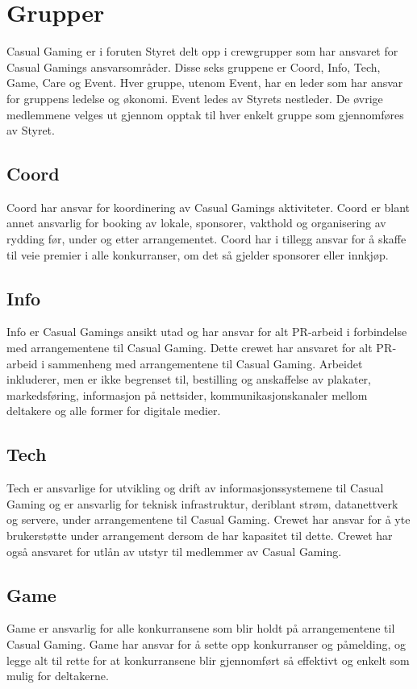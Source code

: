 \section{Grupper}
Casual Gaming er i foruten Styret delt opp i crewgrupper som har ansvaret for Casual Gamings ansvarsområder. Disse seks gruppene er Coord, Info, Tech, Game, Care og Event. Hver gruppe, utenom Event, har en leder som har ansvar for gruppens ledelse og økonomi. Event ledes av Styrets nestleder. De øvrige medlemmene velges ut gjennom opptak til hver enkelt gruppe som gjennomføres av Styret.

\subsection{Coord}
Coord har ansvar for koordinering av Casual Gamings aktiviteter. Coord er blant annet ansvarlig for booking av lokale, sponsorer, vakthold og organisering av rydding før, under og etter arrangementet. Coord har i tillegg ansvar for å skaffe til veie premier i alle konkurranser, om det så gjelder sponsorer eller innkjøp.

\subsection{Info}
Info er Casual Gamings ansikt utad og har ansvar for alt PR-arbeid i forbindelse med arrangementene til Casual Gaming. Dette crewet har ansvaret for alt PR­‐arbeid i sammenheng med arrangementene til Casual Gaming. Arbeidet inkluderer, men er ikke begrenset til, bestilling og anskaffelse av plakater, markedsføring, informasjon på nettsider, kommunikasjonskanaler mellom deltakere og alle former for digitale medier.

\subsection{Tech}
Tech er ansvarlige for utvikling og drift av informasjonssystemene til Casual Gaming og er ansvarlig for teknisk infrastruktur, deriblant strøm, datanettverk og servere, under arrangementene til Casual Gaming. Crewet har ansvar for å yte brukerstøtte under arrangement dersom de har kapasitet til dette. Crewet har også ansvaret for utlån av utstyr til medlemmer av Casual Gaming.

\subsection{Game}
Game er ansvarlig for alle konkurransene som blir holdt på arrangementene til Casual Gaming. Game har ansvar for å sette opp konkurranser og påmelding, og legge alt til rette for at konkurransene blir gjennomført så effektivt og enkelt som mulig for deltakerne.

